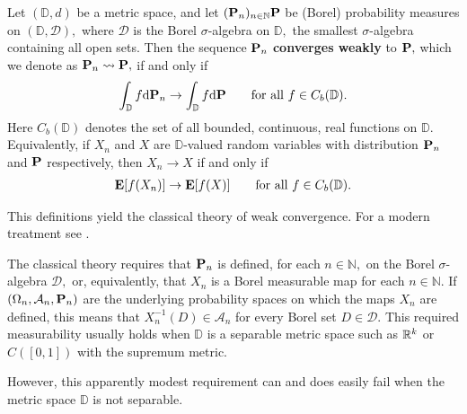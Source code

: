 Let 
$
(
\mathbb{D}
,
d
)
$
be a metric space, and let 
$
(\P_n)_{n\in \mathbb{N}}
  \P
$
be (Borel) probability measures
on
$
(
\mathbb{D}
,
\mathcal{D}
)
,
$
where 
$\mathcal{D}$
is the Borel $\sigma$-algebra on $\mathbb{D},$
the smallest $\sigma$-algebra
containing all open sets.
Then the sequence 
$\P_n$
\textbf{converges weakly}
to 
$\P,$
which we denote as $\P_n \rightsquigarrow \P,$
if and only if 
\begin{gather}
  \int_\mathbb{D}
  f
  \text{d}
  \P_n
  \to
  \int_\mathbb{D}
  f
  \text{d}
  \P
  \qquad
  \text{for all}
  \ 
  f
  \in
  C_b(\mathbb{D})
  .
\end{gather}
Here 
$
  C_b(\mathbb{D})
$
denotes the set of all bounded, continuous, real functions on $\mathbb{D}.$
Equivalently, if 
$X_n$ and $X$
are 
$\mathbb{D}$-valued
random variables with distribution 
$\P_n$ and $\P$
respectively, then 
$X_n \to X$
if and only if 
\begin{gather}
  \E[f(X_n)]
  \to
  \E[f(X)]
  \qquad
  \text{for all}
  \ 
  f
  \in
  C_b(\mathbb{D})
  .
\end{gather}

This definitions yield the classical theory of weak convergence.
For a modern treatment see \cite{Klenke2020}.

The classical theory requires that 
$\P_n$
is defined, for each $n\in \mathbb{N},$
on the Borel $\sigma$-algebra $\mathcal{D},$
or, equivalently, that $X_n$ is a Borel measurable map for each $n\in \mathbb{N}.$
If 
$
(
\Omega_n,
\mathcal{A}_n,
\P_n
)
$
are the underlying probability spaces on which the maps 
$X_n$
are defined, this means that
$X_n^{-1}(D)\in \mathcal{A}_n$
for every Borel set $D \in \mathcal{D}.$
This required measurability usually holds when $\mathbb{D}$
is a separable metric space such as $\R^k$
or $C([0,1])$ with the supremum metric.

However, this apparently modest requirement can and does easily fail when the metric space $\mathbb{D}$ is not separable.

